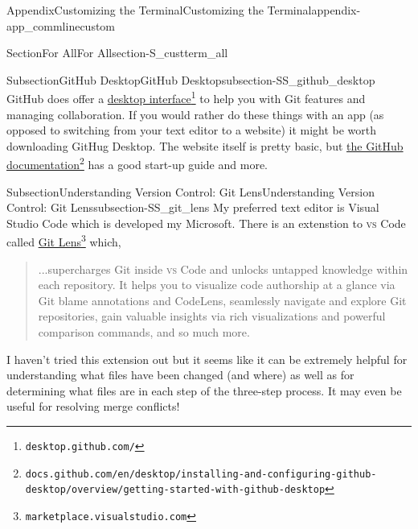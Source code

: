 \documentclass[oneside,10pt,]{book}
\newcommand{\initialism}[1]{\textsc{\MakeLowercase{#1}}}
\begin{document}
\begin{appendixptx}{Appendix}{Customizing the Terminal}{}{Customizing the Terminal}{}{}{appendix-app_commlinecustom}
\begin{sectionptx}{Section}{For All}{}{For All}{}{}{section-S_custterm_all}
\begin{subsectionptx}{Subsection}{GitHub Desktop}{}{GitHub Desktop}{}{}{subsection-SS_github_desktop}
GitHub does offer a \href{https://desktop.github.com/}{desktop interface}\footnote{\nolinkurl{desktop.github.com/}\label{fn-SS_github_desktop-d-b}} to help you with Git features and managing collaboration. If you would rather do these things with an app (as opposed to switching from your text editor to a website) it might be worth downloading GitHug Desktop. The website itself is pretty basic, but \href{https://docs.github.com/en/desktop/installing-and-configuring-github-desktop/overview/getting-started-with-github-desktop}{the GitHub documentation}\footnote{\nolinkurl{docs.github.com/en/desktop/installing-and-configuring-github-desktop/overview/getting-started-with-github-desktop}\label{fn-SS_github_desktop-d-d}} has a good start-up guide and more.%
\end{subsectionptx}
%
%
\typeout{************************************************}
\typeout{************************************************}
%
\begin{subsectionptx}{Subsection}{Understanding Version Control: Git Lens}{}{Understanding Version Control: Git Lens}{}{}{subsection-SS_git_lens}
%
%
My preferred text editor is Visual Studio Code which is developed my Microsoft. There is an extenstion to \initialism{VS} Code called \href{https://marketplace.visualstudio.com/items?itemName=eamodio.gitlens}{Git Lens}\footnote{\nolinkurl{marketplace.visualstudio.com}\label{fn-SS_git_lens-d-c}} which,%
\begin{quote}%
...supercharges Git inside \initialism{VS} Code and unlocks untapped knowledge within each repository. It helps you to visualize code authorship at a glance via Git blame annotations and CodeLens, seamlessly navigate and explore Git repositories, gain valuable insights via rich visualizations and powerful comparison commands, and so much more.%
\end{quote}
I haven't tried this extension out but it seems like it can be extremely helpful for understanding what files have been changed (and where) as well as for determining what files are in each step of the three-step process. It may even be useful for resolving merge conflicts!%
\end{subsectionptx}
\end{sectionptx}
\end{appendixptx}
%
%
\typeout{************************************************}
\typeout{************************************************}
\end{document}
